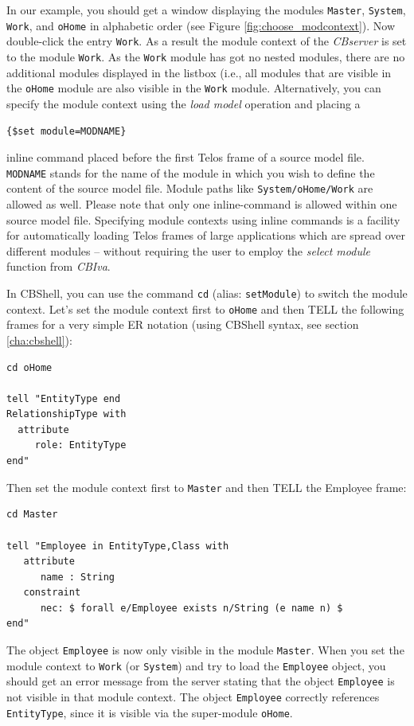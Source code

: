 In our example, you should get a window displaying
the modules {\tt Master}, {\tt System}, {\tt Work}, and {\tt oHome} in alphabetic order
(see Figure \ref{fig:choose_modcontext}).
Now double-click the entry {\tt Work}. As a result the module context of
the {\em CBserver} is set to the module {\tt Work}. As the {\tt Work} module
has got no nested modules, there are no additional modules
displayed in the listbox (i.e., all modules that are visible in the {\tt oHome}
module are also visible in the {\tt Work} module.
Alternatively, you can specify the module context using the {\em load model\/} operation
and placing a

{\tt \{\$set module=MODNAME\}}

inline command placed before the first Telos frame
 of a  source model file.
{\tt MODNAME} stands for the name of the module in which you wish to define the
content of the source model file. Module paths like {\tt System/oHome/Work} are allowed as well.
Please note that only one inline-command is allowed within one
source model file.
Specifying module contexts using inline commands is a facility for automatically loading
Telos frames of large applications
which are spread over different modules -- without requiring the user to employ
the {\em select module\/} function from {\em CBIva}.

In CBShell, you can use the command {\tt cd} (alias: {\tt setModule}) to switch the module context.
Let's set the module context first to {\tt oHome} and then TELL the
following frames for a very simple ER notation (using CBShell syntax, see section \ref{cha:cbshell}):

\begin{verbatim}
cd oHome

tell "EntityType end
RelationshipType with
  attribute
     role: EntityType
end"
\end{verbatim}

Then set the module context first to {\tt Master} and then TELL the
Employee frame:

\begin{verbatim}
cd Master

tell "Employee in EntityType,Class with
   attribute
      name : String
   constraint
      nec: $ forall e/Employee exists n/String (e name n) $
end"
\end{verbatim}

The object {\tt Employee} is now only visible in the module {\tt Master}. When you
set the module context to {\tt Work} (or {\tt System}) and try to load
the {\tt Employee} object, you should get an error message from the server stating that
the object {\tt Employee} is not visible in that module context. The object 
{\tt Employee} correctly references {\tt EntityType}, since it is visible via
the super-module {\tt oHome}.

